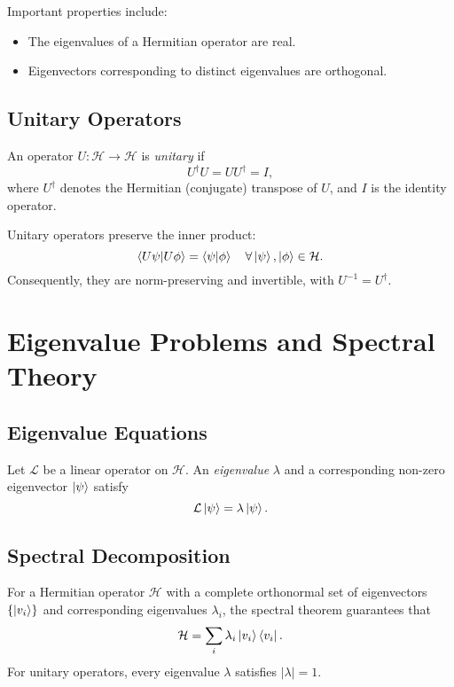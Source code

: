	Important properties include:
	\begin{itemize}
		\item The eigenvalues of a Hermitian operator are real.
		\item Eigenvectors corresponding to distinct eigenvalues are orthogonal.
	\end{itemize}
	
	\section{Unitary Operators}
	\begin{definition}
		An operator \( U:\mathcal{H}\to\mathcal{H} \) is \emph{unitary} if
		\[
		U^\dagger U = U U^\dagger = I,
		\]
		where \( U^\dagger \) denotes the Hermitian (conjugate) transpose of \( U \), and \( I \) is the identity operator.
	\end{definition}
	
	Unitary operators preserve the inner product:
	\[
	\left\langle U\psi \middle| U\phi \right\rangle = \left\langle \psi \middle| \phi \right\rangle \quad \forall \left| \psi \right\rangle,\left| \phi \right\rangle\in\mathcal{H}.
	\]
	Consequently, they are norm-preserving and invertible, with \( U^{-1} = U^\dagger \).
	
	\chapter{Eigenvalue Problems and Spectral Theory}
	
	\section{Eigenvalue Equations}
	Let \( \mathcal{L} \) be a linear operator on \(\mathcal{H}\). An \emph{eigenvalue} \(\lambda\) and a corresponding non-zero eigenvector \(\left| \psi \right\rangle\) satisfy
	\[
	\mathcal{L}\left| \psi \right\rangle = \lambda \left| \psi \right\rangle.
	\]
	
	\section{Spectral Decomposition}
	For a Hermitian operator \( \mathcal{H} \) with a complete orthonormal set of eigenvectors \(\{\left| v_i \right\rangle\}\) and corresponding eigenvalues \(\lambda_i\), the spectral theorem guarantees that
	\[
	\mathcal{H} = \sum_{i} \lambda_i \left| v_i \right\rangle\left\langle v_i \right|.
	\]
	For unitary operators, every eigenvalue \(\lambda\) satisfies \(|\lambda|=1\).
	
